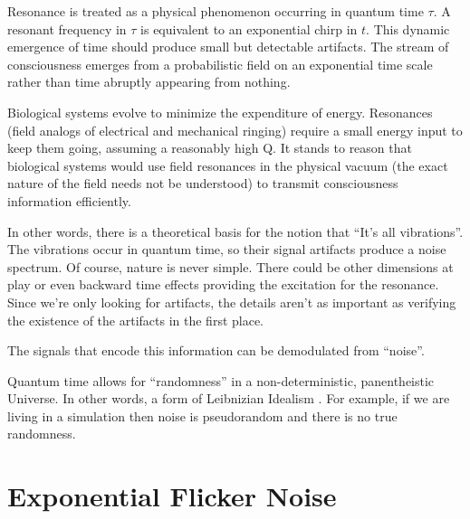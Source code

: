 Resonance is treated as a physical phenomenon occurring in quantum time $\tau$.
A resonant frequency in $\tau$ is equivalent to an exponential chirp in $t$.
This dynamic emergence of time should produce small but detectable artifacts.
The stream of consciousness emerges from a probabilistic field on an
exponential time scale rather than time abruptly appearing from nothing.

Biological systems evolve to minimize the expenditure of energy. Resonances
(field analogs of electrical and mechanical ringing) require a small energy
input to keep them going, assuming a reasonably high Q. It stands to reason
that biological systems would use field resonances in the physical vacuum
(the exact nature of the field needs not be understood)
to transmit consciousness information efficiently.

In other words, there is a theoretical basis for the notion that
``It's all vibrations''.
The vibrations occur in quantum time,
so their signal artifacts produce a noise spectrum.
Of course, nature is never simple. There could be other dimensions at play or
even backward time effects providing the excitation for the resonance.
Since we're only looking for artifacts, the details aren't as important
as verifying the existence of the artifacts in the first place.

The signals that encode this information can be demodulated from ``noise''.

Quantum time allows for ``randomness'' in a non-deterministic,
panentheistic Universe.
In other words, a form of Leibnizian Idealism \cite{Leibniz}.
For example, if we are living in a simulation then noise is
pseudorandom and there is no true randomness.

\section{Exponential Flicker Noise}

